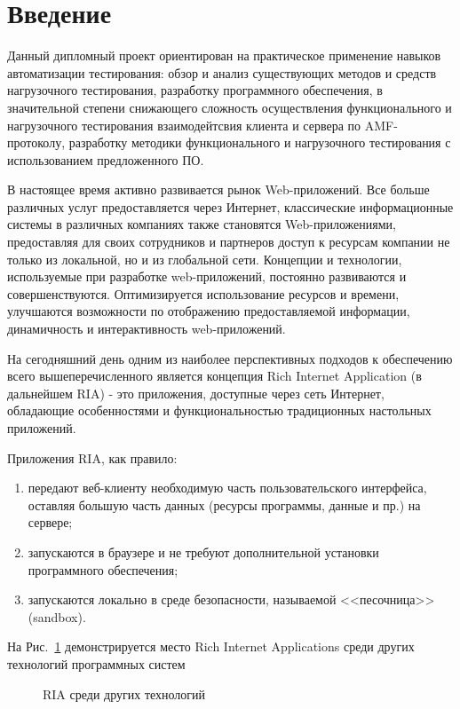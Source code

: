 \chapter*{Введение} %

Данный дипломный проект ориентирован на практическое применение навыков автоматизации тестирования:
обзор и анализ существующих методов и средств нагрузочного тестирования, разработку программного обеспечения,
в значительной степени снижающего сложность осуществления функционального и нагрузочного тестирования
взаимодейтсвия клиента и сервера по AMF-протоколу, разработку методики функционального и нагрузочного
тестирования с использованием предложенного ПО.

В настоящее время активно развивается рынок Web-приложений. Все больше различных услуг 
предоставляется через Интернет, классические информационные системы в различных компаниях
также становятся Web-приложениями, предоставляя для своих сотрудников и партнеров
доступ к ресурсам компании не только из локальной, но и из глобальной сети. Концепции
и технологии, используемые при разработке web-приложений, постоянно развиваются и
совершенствуются. Оптимизируется использование ресурсов и времени, улучшаются
возможности по отображению предоставляемой информации, динамичность и интерактивность
web-приложений.

На сегодняшний день одним из наиболее перспективных подходов к обеспечению всего 
вышеперечисленного является концепция Rich Internet Application (в дальнейшем RIA) - 
это приложения, доступные через сеть Интернет, обладающие особенностями и
функциональностью традиционных настольных приложений.
 
Приложения RIA, как правило:

\begin{enumerate}
\item передают веб-клиенту необходимую часть пользовательского  интерфейса,
оставляя большую часть данных (ресурсы программы, данные и пр.) на сервере;
\item запускаются в браузере и не требуют дополнительной установки программного
обеспечения;
\item запускаются локально в среде безопасности, называемой <<песочница>> (sandbox).
\end{enumerate}

На Рис.~\ref{ris:RIAinWorld.png} демонстрируется место Rich Internet Applications 
среди других технологий программных систем
\begin{figure}[h]
\caption{RIA среди других технологий}
\label{ris:RIAinWorld.png}
\end{figure}

